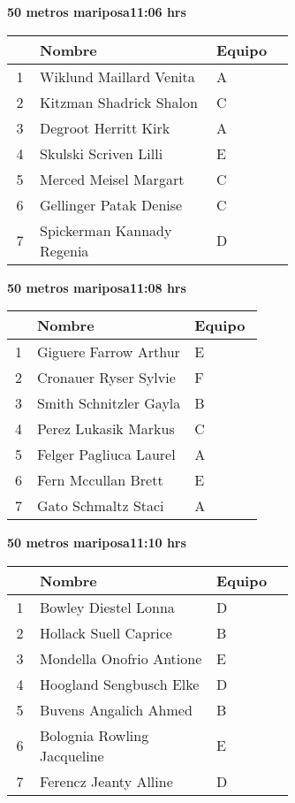 \begin{minipage}{0.95\linewidth}
\begin{center}
\textbf{
50 metros mariposa\hspace{1cm}11:06 hrs}
\end{center}
\begin{tabular}{cp{0.63\linewidth}l}
\hline
& \textbf{Nombre} & \textbf{Equipo} \\ \hline
1 & Wiklund Maillard Venita & A \\ 
2 & Kitzman Shadrick Shalon & C \\ 
3 & Degroot Herritt Kirk & A \\ 
4 & Skulski Scriven Lilli & E \\ 
5 & Merced Meisel Margart & C \\ 
6 & Gellinger Patak Denise & C \\ 
7 & Spickerman Kannady Regenia & D \\ 
\end{tabular}
\end{minipage}
\begin{minipage}{0.95\linewidth}
\begin{center}
\textbf{
50 metros mariposa\hspace{1cm}11:08 hrs}
\end{center}
\begin{tabular}{cp{0.63\linewidth}l}
\hline
& \textbf{Nombre} & \textbf{Equipo} \\ \hline
1 & Giguere Farrow Arthur & E \\ 
2 & Cronauer Ryser Sylvie & F \\ 
3 & Smith Schnitzler Gayla & B \\ 
4 & Perez Lukasik Markus & C \\ 
5 & Felger Pagliuca Laurel & A \\ 
6 & Fern Mccullan Brett & E \\ 
7 & Gato Schmaltz Staci & A \\ 
\end{tabular}
\end{minipage}
\begin{minipage}{0.95\linewidth}
\begin{center}
\textbf{
50 metros mariposa\hspace{1cm}11:10 hrs}
\end{center}
\begin{tabular}{cp{0.63\linewidth}l}
\hline
& \textbf{Nombre} & \textbf{Equipo} \\ \hline
1 & Bowley Diestel Lonna & D \\ 
2 & Hollack Suell Caprice & B \\ 
3 & Mondella Onofrio Antione & E \\ 
4 & Hoogland Sengbusch Elke & D \\ 
5 & Buvens Angalich Ahmed & B \\ 
6 & Bolognia Rowling Jacqueline & E \\ 
7 & Ferencz Jeanty Alline & D \\ 
\end{tabular}
\end{minipage}
